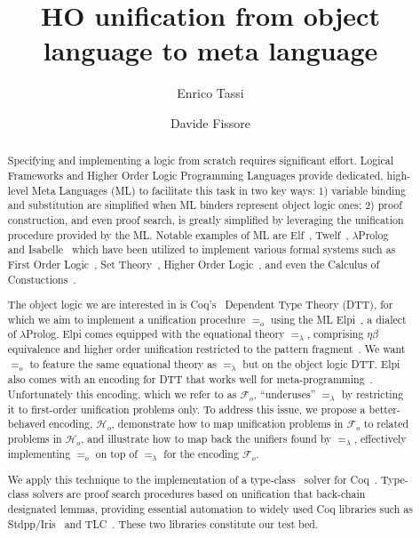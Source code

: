 \documentclass[sigconf,natbib=false]{acmart}
\newcommand{\U}{\ensuremath{=_o}}
\newcommand{\Ue}{\ensuremath{=_\lambda}}
\newcommand{\Fo}{\ensuremath{\mathcal{F}_{\!o}}}
\newcommand{\Ho}{\ensuremath{\mathcal{H}_o}}
\begin{document}
\title{HO unification from object language to meta language} 

\author{Enrico Tassi}

\author{Davide Fissore}

\begin{abstract}
  Specifying and implementing a logic from scratch requires significant effort.
  Logical Frameworks and Higher Order Logic Programming Languages provide
  dedicated, high-level Meta Languages (ML) to facilitate this task in two
  key ways: 1) variable binding and substitution are simplified when ML binders
  represent object logic ones; 2) proof construction, and even proof search, is
  greatly simplified by leveraging the unification procedure provided by the ML.
  Notable examples of ML are Elf~\cite{elf}, Twelf~\cite{twelf},
  $\lambda$Prolog~\cite{miller_nadathur_2012} and
  Isabelle~\cite{10.1007/978-3-540-71067-7_7}
  which have been utilized to implement various formal systems such as
  First Order Logic~\cite{felty88cade},
  Set Theory~\cite{10.1007/BF00881873},
  Higher Order Logic~\cite{books/sp/NipkowPW02}, and even the Calculus of
  Constuctions~\cite{felty93lics}.
  
  The object logic we are interested in is Coq's~\cite{Coq-refman}
  Dependent Type Theory (DTT),
  for which we aim to implement a unification procedure \U{} using the ML
  Elpi~\cite{dunchev15lpar}, a dialect of $\lambda$Prolog.
  Elpi comes equipped with the equational theory \Ue{}, comprising
  $\eta\beta$ equivalence
  and higher order unification restricted to the pattern
  fragment~\cite{miller92jsc}.
  We want \U{} to feature the same equational theory as \Ue{} but on the
  object logic DTT. Elpi also comes with an encoding for DTT that works well
  for meta-programming~\cite{tassi:hal-01637063,tassi:hal-01897468,gregoire:hal-03800154,newtc}.
  Unfortunately this encoding, which we refer to as \Fo{},
  ``underuses'' \Ue{} by restricting it to first-order unification problems only. 
  To address this issue, we propose a better-behaved encoding, \Ho{},
  demonstrate how to map unification problems in \Fo{}
  to related problems in \Ho{}, and illustrate
  how to map back the unifiers found by \Ue{}, effectively implementing
   \U{} on top of \Ue{} for the encoding \Fo{}.
   
  We apply this technique to the implementation of a type-class~\cite{wadler89}
  solver for Coq~\cite{Coq-refman}.
  Type-class solvers are proof search procedures based on
  unification that back-chain designated lemmas, providing essential
  automation to widely used 
  Coq libraries such as Stdpp/Iris~\cite{JUNG_KREBBERS_JOURDAN_BIZJAK_BIRKEDAL_DREYER_2018}
  and TLC~\cite{10.1007/978-3-642-14052-5_15}. These two libraries
  constitute our test bed.
\end{abstract} 
\end{document}
